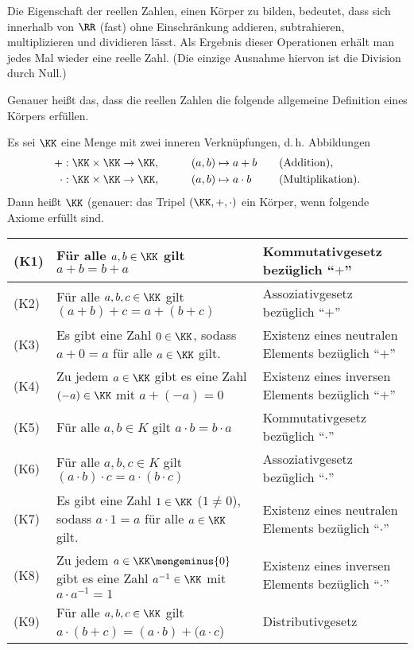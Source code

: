 \begin{antwort}
  Die Eigenschaft der reellen Zahlen, einen 
  Körper zu bilden, bedeutet, 
  dass sich innerhalb von $\RR$ (fast) 
  ohne Einschränkung addieren, subtrahieren, multiplizieren 
  und dividieren lässt. Als Ergebnis dieser Operationen erhält man jedes Mal 
  wieder eine reelle Zahl. 
  (Die einzige Ausnahme hiervon ist die Division durch Null.)

  Genauer heißt das, dass die reellen Zahlen die folgende allgemeine Definition 
  eines Körpers erfüllen.

  \medskip

  \noindent
  Es sei $\KK$ eine Menge mit zwei inneren Verknüpfungen, d.\,h. Abbildungen
  \begin{alignat*}{4}
    + &: \KK\times\KK \to \KK,\qquad &(a,b) &\mapsto a+b \quad &&\text{(Addition)}, \\
    \cdot &:\KK\times\KK \to \KK,\qquad &(a,b) &\mapsto a\cdot b 
    \quad &&\text{(Multiplikation)}.
  \end{alignat*}
  Dann heißt $\KK$ (genauer: das Tripel $(\KK, + , \cdot)$ ein Körper, 
  wenn folgende Axiome erfüllt sind.

  \medskip
  \noindent
  {\renewcommand{\arraystretch}{1.4}
    \begin{tabular}{@{}l|p{60mm}|p{50mm}} \hline
      (K1)&
      Für alle $a,b \in \KK$ gilt $a+b=b+a$ & Kommutativgesetz bezüglich "`$+$"' \\\hline
      (K2)&
      Für alle $a,b,c \in \KK$ gilt $(a+b)+c=a+(b+c)$ & Assoziativgesetz bezüglich 
      "`$+$"' \\\hline
      (K3)&
      Es gibt eine Zahl $0\in\KK$, sodass $a+0=a$ für alle $a\in\KK$ gilt. & 
      Existenz eines neutralen Elements bezüglich "`$+$"' \\\hline 
      (K4)&
      Zu jedem $a\in\KK$ gibt es eine Zahl $(-a)\in\KK$ mit $a+(-a)=0$ & 
      Existenz eines inversen Elements bezüglich "`$+$"' \\\hline
      (K5)&
      Für alle $a,b \in K$ gilt $a\cdot b=b\cdot a$ & 
      Kommutativgesetz bezüglich "`$\cdot$"' \\\hline
      (K6)&
      Für alle $a,b,c \in K$ gilt $(a\cdot b)\cdot c=a\cdot (b\cdot c)$ & 
      Assoziativgesetz bezüglich "`$\cdot$"' \\\hline
      (K7)&
      Es gibt eine Zahl $1\in\KK$ ($1\not=0$), sodass $a\cdot 1=a$ für alle $a\in\KK$ gilt. & 
      Existenz eines neutralen Elements bezüglich "`$\cdot $"' \\\hline 
      (K8)&
      Zu jedem $a\in\KK\mengeminus\{0\}$ 
      gibt es eine Zahl $a^{-1}\in\KK$ mit $a\cdot a^{-1}=1$ & 
      Existenz eines inversen Elements bezüglich "`$\cdot$"' \\\hline
      (K9)&
      Für alle $a,b,c\in\KK$ gilt $a\cdot (b+c) = (a\cdot b)+ (a\cdot c$) & 
      Distributivgesetz \\\hline
    \end{tabular}
  }
  

\end{antwort}
